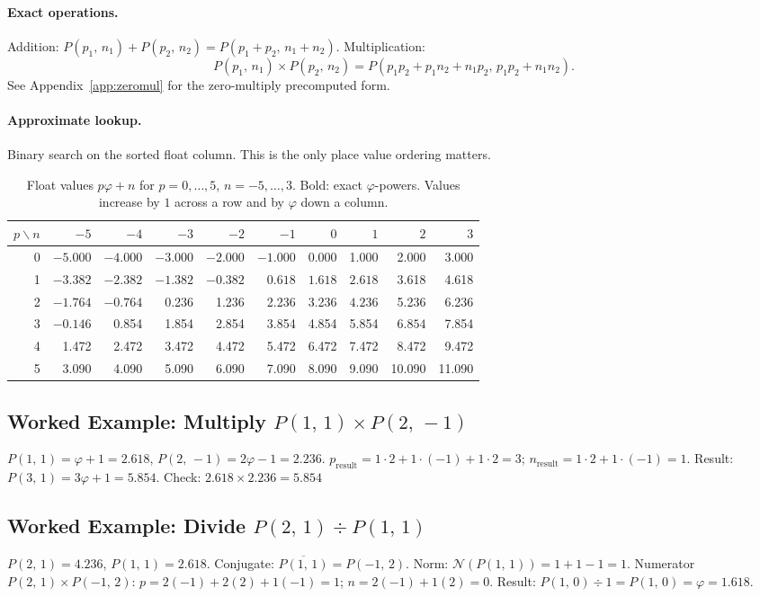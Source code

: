 \documentclass[12pt]{article}
\theoremstyle{definition}
\theoremstyle{remark}
\newcommand{\Phib}[2]{P(#1,\,#2)}
\begin{document}
\paragraph{Exact operations.}
Addition: $\Phib{p_1}{n_1}+\Phib{p_2}{n_2}=\Phib{p_1+p_2}{n_1+n_2}$.
Multiplication:
\[
  \Phib{p_1}{n_1}\times\Phib{p_2}{n_2}
  = \Phib{p_1 p_2+p_1 n_2+n_1 p_2}{p_1 p_2+n_1 n_2}.
\]
See Appendix~\ref{app:zeromul} for the zero-multiply precomputed form.
\paragraph{Approximate lookup.}
Binary search on the sorted float column.  This is the only place
value ordering matters.
\begin{table}[h]
\centering
\small
\caption{Float values $p\varphi+n$ for $p=0,\ldots,5$, $n=-5,\ldots,3$.
  Bold: exact $\varphi$-powers.  Values increase by $1$ across a row
  and by $\varphi$ down a column.}
\label{tab:phibase_grid}
\begin{tabular}{r|rrrrrrrrr}
\toprule
$p\backslash n$ & $-5$ & $-4$ & $-3$ & $-2$ & $-1$ & $0$ & $1$ & $2$ & $3$ \\
\midrule
0 &$-5.000$&$-4.000$&$-3.000$&$-2.000$&$-1.000$& 0.000 & 1.000 & 2.000 & 3.000\\
1 &$-3.382$&$-2.382$&$-1.382$&$-0.382$&$\mathbf{0.618}$&$\mathbf{1.618}$&$\mathbf{2.618}$& 3.618 & 4.618\\
2 &$-1.764$&$-0.764$& 0.236 & 1.236 & 2.236 & 3.236 &$\mathbf{4.236}$& 5.236 & 6.236\\
3 &$-0.146$& 0.854 & 1.854 & 2.854 & 3.854 & 4.854 & 5.854 &$\mathbf{6.854}$& 7.854\\
4 & 1.472 & 2.472 & 3.472 & 4.472 & 5.472 & 6.472 & 7.472 & 8.472 & 9.472\\
5 & 3.090 & 4.090 & 5.090 & 6.090 & 7.090 & 8.090 & 9.090 &10.090 &11.090\\
\bottomrule
\end{tabular}
\end{table}
\subsection*{Worked Example: Multiply $\Phib{1}{1}\times\Phib{2}{-1}$}
$\Phib{1}{1}=\varphi+1=2.618$, $\Phib{2}{-1}=2\varphi-1=2.236$.
$p_\text{result}=1\cdot2+1\cdot(-1)+1\cdot2=3$;\quad
$n_\text{result}=1\cdot2+1\cdot(-1)=1$.
Result: $\Phib{3}{1}=3\varphi+1=5.854$.
Check: $2.618\times2.236=5.854$\;\checkmark
\subsection*{Worked Example: Divide $\Phib{2}{1}\div\Phib{1}{1}$}
$\Phib{2}{1}=4.236$, $\Phib{1}{1}=2.618$.
Conjugate: $\overline{\Phib{1}{1}}=\Phib{-1}{2}$.
Norm: $\mathcal{N}(\Phib{1}{1})=1+1-1=1$.
Numerator $\Phib{2}{1}\times\Phib{-1}{2}$:
$p=2(-1)+2(2)+1(-1)=1$; $n=2(-1)+1(2)=0$.
Result: $\Phib{1}{0}\div1=\Phib{1}{0}=\varphi=1.618$.\;\checkmark
\end{document}
